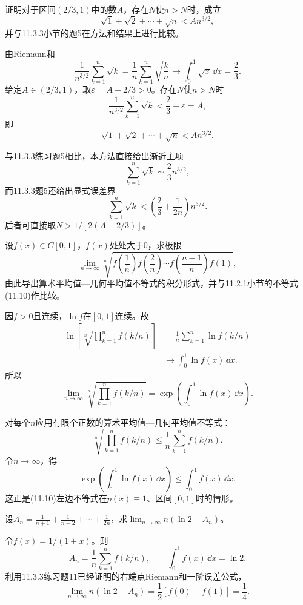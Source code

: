 \begin{xexercise}[2]
证明对于区间$(2/3,1)$中的数$A$，存在$N$使$n>N$时，成立
  \[
    \sqrt1+\sqrt2+\cdots+\sqrt n<An^{3/2},
  \]
  并与11.3.3小节的题5在方法和结果上进行比较。
\end{xexercise}
\begin{xsolution}
由Riemann和
\[
 \frac1{n^{3/2}}\sum_{k=1}^n\sqrt k
 =\frac1n\sum_{k=1}^n\sqrt{\frac kn}
 \longrightarrow\int_0^1\sqrt x\,\dd x=\frac23.
\]
给定$A\in(2/3,1)$，取$\varepsilon=A-2/3>0$。存在$N$使$n>N$时
\[
 \frac1{n^{3/2}}\sum_{k=1}^n\sqrt k<\frac23+\varepsilon=A,
\]
即
\[
 \sqrt1+\sqrt2+\cdots+\sqrt n<An^{3/2}.
\]

与11.3.3练习题5相比，本方法直接给出渐近主项
\[
 \sum_{k=1}^n\sqrt k\sim\frac23n^{3/2},
\]
而11.3.3题5还给出显式误差界
\[
 \sum_{k=1}^n\sqrt k<\left(\frac23+\frac1{2n}\right)n^{3/2}.
\]
后者可直接取$N>1/[2(A-2/3)]$。
\end{xsolution}


\begin{xexercise}[3]
设$f(x)\in C[0,1]$，$f(x)$处处大于0，求极限
  \[
    \lim_{n\to\infty}\sqrt[n]{f\left(\frac1n\right)f\left(\frac2n\right)\cdots f\left(\frac{n-1}{n}\right)f(1)},
  \]
  由此导出算术平均值—几何平均值不等式的积分形式，并与11.2.1小节的不等式(11.10)作比较。
\end{xexercise}
\begin{xsolution}
因$f>0$且连续，$\ln f$在$[0,1]$连续。故
\begin{align*}
\ln\left[
\sqrt[n]{\prod_{k=1}^nf(k/n)}
\right]
&=\frac1n\sum_{k=1}^n\ln f(k/n)\\
&\longrightarrow\int_0^1\ln f(x)\,\dd x.
\end{align*}
所以
\[
 \boxed{
 \lim_{n\to\infty}\sqrt[n]{\prod_{k=1}^nf(k/n)}
 =\exp\left(\int_0^1\ln f(x)\,\dd x\right)}.
\]

对每个$n$应用有限个正数的算术平均值—几何平均值不等式：
\[
 \sqrt[n]{\prod_{k=1}^nf(k/n)}
 \le\frac1n\sum_{k=1}^nf(k/n).
\]
令$n\to\infty$，得
\[
 \exp\left(\int_0^1\ln f(x)\,\dd x\right)
 \le\int_0^1f(x)\,\dd x.
\]
这正是(11.10)左边不等式在$p(x)\equiv1$、区间$[0,1]$时的情形。
\end{xsolution}


\begin{xexercise}[4]
设$A_n=\frac1{n+1}+\frac1{n+2}+\cdots+\frac1{2n}$，求$\displaystyle\lim_{n\to\infty}n(\ln2-A_n)$。
\end{xexercise}
\begin{xsolution}
令$f(x)=1/(1+x)$。则
\[
 A_n=\frac1n\sum_{k=1}^nf(k/n),
 \qquad
 \int_0^1f(x)\,\dd x=\ln2.
\]
利用11.3.3练习题11已经证明的右端点Riemann和一阶误差公式，
\[
 \lim_{n\to\infty}n(\ln2-A_n)
 =\frac12[f(0)-f(1)]
 =\boxed{\frac14}.
\]
\end{xsolution}


